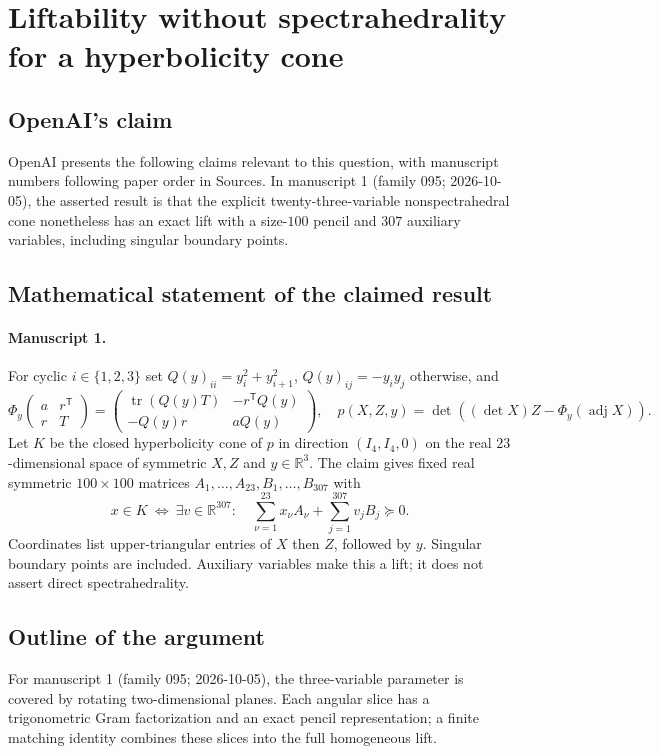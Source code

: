 \documentclass[11pt]{article}
\begin{document}
\section*{Liftability without spectrahedrality for a hyperbolicity cone}

\subsection{OpenAI's claim}
OpenAI presents the following claims relevant to this question, with manuscript numbers following paper order in Sources. In manuscript 1 (family 095; 2026-10-05), the asserted result is that the explicit twenty-three-variable nonspectrahedral cone nonetheless has an exact lift with a size-$100$ pencil and $307$ auxiliary variables, including singular boundary points.

\subsection{Mathematical statement of the claimed result}
\paragraph{Manuscript 1.}
For cyclic $i\in\{1,2,3\}$ set $Q(y)_{ii}=y_i^2+y_{i+1}^2$, $Q(y)_{ij}=-y_i y_j$ otherwise, and
\[
 \Phi_y\begin{pmatrix}a&r^{\mathsf T}\\r&T\end{pmatrix}
 =\begin{pmatrix}\operatorname{tr}(Q(y)T)&-r^{\mathsf T}Q(y)\\-Q(y)r&aQ(y)\end{pmatrix},
 \quad p(X,Z,y)=\det((\det X)Z-\Phi_y(\operatorname{adj}X)).
\]
Let $K$ be the closed hyperbolicity cone of $p$ in direction $(I_4,I_4,0)$ on the real $23$-dimensional space of symmetric $X,Z$ and $y\in\mathbb R^3$. The claim gives fixed real symmetric $100\times100$ matrices $A_1,\ldots,A_{23},B_1,\ldots,B_{307}$ with
\[
 x\in K\ \Longleftrightarrow\ \exists v\in\mathbb R^{307}:\quad
 \sum_{\nu=1}^{23}x_{\nu} A_{\nu}+\sum_{j=1}^{307}v_jB_j\succeq0.
\]
Coordinates list upper-triangular entries of $X$ then $Z$, followed by $y$. Singular boundary points are included. Auxiliary variables make this a lift; it does not assert direct spectrahedrality.

\subsection{Outline of the argument}
For manuscript 1 (family 095; 2026-10-05), the three-variable parameter is covered by rotating two-dimensional planes. Each angular slice has a trigonometric Gram factorization and an exact pencil representation; a finite matching identity combines these slices into the full homogeneous lift.
\end{document}
